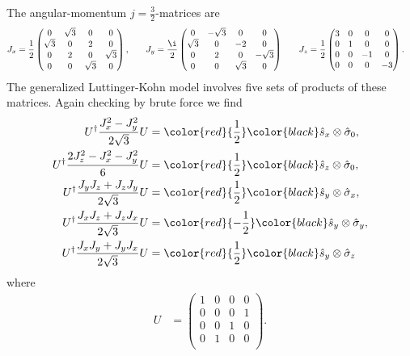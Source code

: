 \documentclass[english, parskip=full]{scrartcl}
\begin{document}
The angular-momentum $j=\frac{3}{2}$-matrices are
\begin{align}
J_x &= \frac{1}{2}\begin{pmatrix} 0 & \sqrt{3} & 0 & 0 \\ \sqrt{3} & 0 & 2 & 0 \\ 0 & 2 & 0 & \sqrt{3} \\ 0 & 0 & \sqrt{3} & 0 \\  \end{pmatrix}, &&& J_y &= \frac{\i}{2}\begin{pmatrix} 0 & -\sqrt{3} & 0 & 0 \\ \sqrt{3} & 0 & -2 & 0 \\ 0 & 2 & 0 & -\sqrt{3} \\ 0 & 0 & \sqrt{3} & 0 \\  \end{pmatrix} &&& J_z &= 
\frac{1}{2} \begin{pmatrix} 3 & 0 & 0 & 0 \\ 0 & 1 & 0 & 0 \\ 0 & 0 & -1 & 0 \\ 0 & 0 & 0 & -3 \\  \end{pmatrix}.
\end{align}
The generalized Luttinger-Kohn model involves five sets of products of these matrices.
Again checking by brute force we find
\begin{align}
U^\dagger \frac{J_x^2 - J_y^2}{2\sqrt{3}}U &= \color{red}{\frac{1}{2}}  \color{black} \hat{s}_x \otimes \hat{\sigma}_0,\\
U^\dagger \frac{2J_z^2 - J_x^2 - J_y^2}{6}U &= \color{red}{\frac{1}{2}}  \color{black} \hat{s}_z \otimes \hat{\sigma}_0,\\
U^\dagger \frac{J_yJ_z + J_zJ_y}{2\sqrt{3}}U &= \color{red}{\frac{1}{2}}  \color{black} \hat{s}_y \otimes \hat{\sigma}_x,\\
U^\dagger \frac{J_xJ_z + J_zJ_x}{2\sqrt{3}}U &= \color{red}{-\frac{1}{2}} \color{black} \hat{s}_y \otimes \hat{\sigma}_y,\\
U^\dagger \frac{J_xJ_y + J_yJ_x}{2\sqrt{3}}U &= \color{red}{\frac{1}{2}} \color{black} \hat{s}_y \otimes \hat{\sigma}_z
\end{align}
where 
\begin{align}
U &= \begin{pmatrix} 1 & 0 & 0 & 0 \\ 0 & 0 & 0 & 1 \\ 0 & 0 & 1 & 0 \\ 0 & 1 & 0 & 0 \\  \end{pmatrix}.
\end{align}
\end{document}
